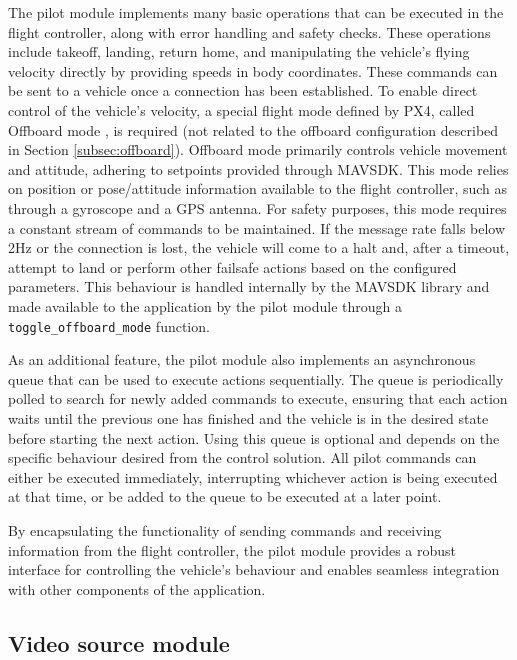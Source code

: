 The pilot module implements many basic operations that can be executed in the flight controller, along with error handling and safety checks. These operations include takeoff, landing, return home, and manipulating the vehicle's flying velocity directly by providing speeds in body coordinates. These commands can be sent to a vehicle once a connection has been established. 
To enable direct control of the vehicle's velocity, a special flight mode defined by PX4, called Offboard mode \cite{offboard-mode}, is required (not related to the offboard configuration described in Section \ref{subsec:offboard}). Offboard mode primarily controls vehicle movement and attitude, adhering to setpoints provided through MAVSDK. This mode relies on position or pose/attitude information available to the flight controller, such as through a gyroscope and a GPS antenna. 
For safety purposes, this mode requires a constant stream of commands to be maintained.
If the message rate falls below 2Hz or the connection is lost, the vehicle will come to a halt and, after a timeout, attempt to land or perform other failsafe actions based on the configured parameters.
This behaviour is handled internally by the MAVSDK library and made available to the application by the pilot module through a \texttt{toggle\_offboard\_mode} function.


As an additional feature, the pilot module also implements an asynchronous queue that can be used to execute actions sequentially. The queue is periodically polled to search for newly added commands to execute, ensuring that each action waits until the previous one has finished and the vehicle is in the desired state before starting the next action. Using this queue is optional and depends on the specific behaviour desired from the control solution. All pilot commands can either be executed immediately, interrupting whichever action is being executed at that time, or be added to the queue to be executed at a later point.


By encapsulating the functionality of sending commands and receiving information from the flight controller, the pilot module provides a robust interface for controlling the vehicle's behaviour and enables seamless integration with other components of the application.


\subsection{Video source module}
\label{subsec:viz-source-module}

